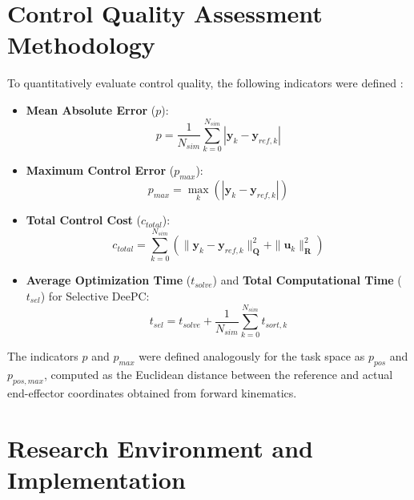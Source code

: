 \section{Control Quality Assessment Methodology}

To quantitatively evaluate control quality, the following indicators were defined \cite{ethzurich, choosewisely}:
\begin{itemize}
    \item \textbf{Mean Absolute Error} ($p$):
    \begin{equation}
        \label{eq:precision}
        p = \frac{1}{N_{sim}} \sum_{k=0}^{N_{sim}} |\boldsymbol{y}_k - \boldsymbol{y}_{ref,k}|
    \end{equation}

    \item \textbf{Maximum Control Error} ($p_{max}$):
    \begin{equation}
        \label{eq:max_precision}
        p_{max} = \max_{k} \left( |\boldsymbol{y}_k - \boldsymbol{y}_{ref,k}| \right)
    \end{equation}

    \item \textbf{Total Control Cost} ($c_{total}$):
    \begin{equation}
        c_{total} = \sum_{k=0}^{N_{sim}} \left( \| \boldsymbol{y}_k - \boldsymbol{y}_{ref,k} \|_{\boldsymbol{Q}}^2 + \| \boldsymbol{u}_k \|_{\boldsymbol{R}}^2 \right)
    \end{equation}

    \item \textbf{Average Optimization Time} ($t_{solve}$) and \textbf{Total Computational Time} ($t_{sel}$) for Selective DeePC:
    \begin{equation}
        t_{sel} = t_{solve} + \frac{1}{N_{sim}} \sum_{k=0}^{N_{sim}} t_{sort,k}
    \end{equation}
\end{itemize}

The indicators $p$ and $p_{max}$ were defined analogously for the task space as $p_{pos}$ and $p_{pos,max}$, computed as the Euclidean distance between the reference and actual end-effector coordinates obtained from forward kinematics.

\section{Research Environment and Implementation}
\label{sec:srodowisko}

